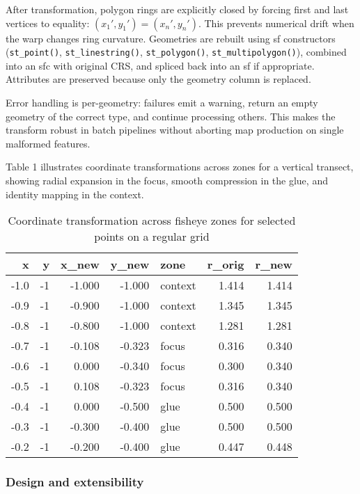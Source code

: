 After transformation, polygon rings are explicitly closed by forcing first and last vertices to equality: \((x_1', y_1') = (x_n', y_n')\). This prevents numerical drift when the warp changes ring curvature. Geometries are rebuilt using sf constructors (\texttt{st\_point()}, \texttt{st\_linestring()}, \texttt{st\_polygon()}, \texttt{st\_multipolygon()}), combined into an sfc with original CRS, and spliced back into an sf if appropriate. Attributes are preserved because only the geometry column is replaced.

Error handling is per-geometry: failures emit a warning, return an empty geometry of the correct type, and continue processing others. This makes the transform robust in batch pipelines without aborting map production on single malformed features.

Table 1 illustrates coordinate transformations across zones for a vertical transect, showing radial expansion in the focus, smooth compression in the glue, and identity mapping in the context.

\begin{table}

\caption{\label{tab:transformation-table}Coordinate transformation across fisheye zones for selected points on a regular grid}
\centering
\begin{tabular}[t]{r|r|r|r|l|r|r}
\hline
x & y & x\_new & y\_new & zone & r\_orig & r\_new\\
\hline
-1.0 & -1 & -1.000 & -1.000 & context & 1.414 & 1.414\\
\hline
-0.9 & -1 & -0.900 & -1.000 & context & 1.345 & 1.345\\
\hline
-0.8 & -1 & -0.800 & -1.000 & context & 1.281 & 1.281\\
\hline
-0.7 & -1 & -0.108 & -0.323 & focus & 0.316 & 0.340\\
\hline
-0.6 & -1 & 0.000 & -0.340 & focus & 0.300 & 0.340\\
\hline
-0.5 & -1 & 0.108 & -0.323 & focus & 0.316 & 0.340\\
\hline
-0.4 & -1 & 0.000 & -0.500 & glue & 0.500 & 0.500\\
\hline
-0.3 & -1 & -0.300 & -0.400 & glue & 0.500 & 0.500\\
\hline
-0.2 & -1 & -0.200 & -0.400 & glue & 0.447 & 0.448\\
\hline
\end{tabular}
\end{table}

\hypertarget{design-and-extensibility}{%
\subsubsection{Design and extensibility}\label{design-and-extensibility}}


